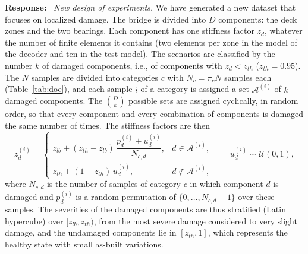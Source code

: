 \documentclass[11pt]{article}
\newenvironment{response}{\par\smallskip\noindent\color{resp}\textbf{Response:}\ }{\par}
\begin{document}
\begin{response}
\textit{New design of experiments.} We have generated a new dataset that focuses on localized damage. The bridge is
divided into $D$ components: the deck zones and the two bearings. Each component has one stiffness factor $z_d$,
whatever the number of finite elements it contains (two elements per zone in the model of the decoder and ten in the test
model). The scenarios are classified by the number $k$ of damaged components, i.e., of components with $z_d<z_{th}$
($z_{th}=0.95$). The $N$ samples are divided into categories $c$ with $N_c=\pi_c N$ samples each (Table~\ref{tab:doe}),
and each sample $i$ of a category is assigned a set $\mathcal{A}^{(i)}$ of $k$ damaged components. The
$\binom{D}{k}$ possible sets are assigned cyclically, in random order, so that every component and every combination of
components is damaged the same number of times. The stiffness factors are then
\begin{equation}
z_d^{(i)}=
\begin{cases}
z_{lb}+(z_{th}-z_{lb})\,\dfrac{p_d^{(i)}+u_d^{(i)}}{N_{c,d}}, & d\in\mathcal{A}^{(i)},\\[2ex]
z_{th}+(1-z_{th})\,u_d^{(i)}, & d\notin\mathcal{A}^{(i)},
\end{cases}
\qquad u_d^{(i)}\sim\mathcal{U}(0,1),
\label{eq:doe}
\end{equation}
where $N_{c,d}$ is the number of samples of category $c$ in which component $d$ is damaged and $p_d^{(i)}$ is a random
permutation of $\{0,\dots,N_{c,d}-1\}$ over these samples. The severities of the damaged components are thus stratified
(Latin hypercube) over $[z_{lb},z_{th})$, from the most severe damage considered to very slight damage, and the
undamaged components lie in $[z_{th},1]$, which represents the healthy state with small as-built variations.


\end{response}
\end{document}
